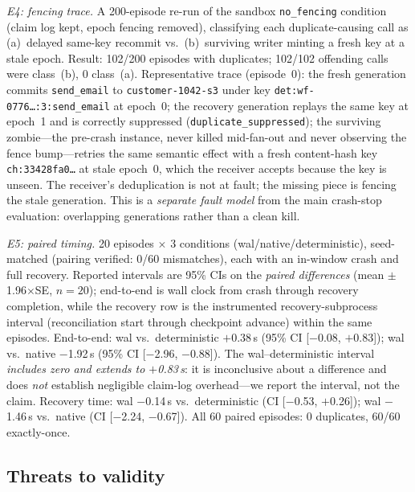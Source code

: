 \documentclass[10pt,journal,compsoc]{IEEEtran}
\begin{document}
\emph{E4: fencing trace.} A 200-episode re-run of the sandbox
\texttt{no\_fencing} condition (claim log kept, epoch fencing
removed), classifying each duplicate-causing call as (a)~delayed
same-key recommit vs.\ (b)~surviving writer minting a fresh key at
a stale epoch. Result: 102/200 episodes with duplicates; 102/102
offending calls were class~(b), 0 class~(a). Representative trace
(episode~0): the fresh generation commits \texttt{send\_email} to
\texttt{customer-1042-s3} under key
\texttt{det:wf-0776\ldots:3:send\_email} at epoch~0; the recovery
generation replays the same key at epoch~1 and is correctly
suppressed (\texttt{duplicate\_suppressed}); the surviving
zombie---the pre-crash instance, never killed mid-fan-out and never
observing the fence bump---retries the same semantic effect with a
fresh content-hash key \texttt{ch:33428fa0\ldots} at stale epoch~0,
which the receiver accepts because the key is unseen. The
receiver's deduplication is not at fault; the missing piece is
fencing the stale generation. This is a \emph{separate fault
model} from the main crash-stop evaluation: overlapping
generations rather than a clean kill.

\emph{E5: paired timing.} 20 episodes $\times$ 3 conditions
(wal/native/deterministic), seed-matched (pairing verified: 0/60
mismatches), each with an in-window crash and full recovery.
Reported intervals are 95\% CIs on the \emph{paired differences}
(mean $\pm$ 1.96$\times$SE, $n{=}20$); end-to-end is wall clock
from crash through recovery completion, while the recovery row is
the instrumented recovery-subprocess interval (reconciliation
start through checkpoint advance) within the same episodes.
End-to-end: wal vs.\ deterministic $+$0.38\,s (95\% CI
[$-$0.08, $+$0.83]); wal vs.\ native $-$1.92\,s (95\% CI
[$-$2.96, $-$0.88]). The wal--deterministic interval
\emph{includes zero and extends to $+$0.83\,s}: it is inconclusive
about a difference and does \emph{not} establish negligible
claim-log overhead---we report the interval, not the claim.
Recovery time: wal $-$0.14\,s vs.\ deterministic (CI
[$-$0.53, $+$0.26]); wal $-$1.46\,s vs.\ native (CI
[$-$2.24, $-$0.67]). All 60 paired episodes: 0 duplicates,
60/60 exactly-once.

\subsection{Threats to validity}
\end{document}
